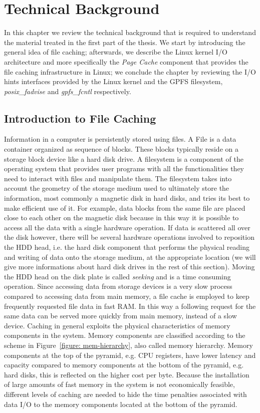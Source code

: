 \chapter{Technical Background} \label{chap: page-cache}
In this chapter we review the technical background that is required to understand the material treated in the first part of the thesis. We start by introducing the general idea
of file caching; afterwards, we describe the Linux kernel I/O architecture and more specifically the \textit{Page Cache} component that provides the file caching infrastructure in Linux; 
we conclude the chapter by reviewing the I/O hints interfaces provided by the Linux kernel and the GPFS filesystem, \textit{posix\_fadvise} and \textit{gpfs\_fcntl} respectively.

\section{Introduction to File Caching} \label{sec: gen-concept}
Information in a computer is persistently stored using files. A File is a data container organized as sequence of blocks. These blocks typically reside on a storage block device like a hard disk drive. 
A filesystem is a component of the operating system that provides user programs with all the functionalities they need to interact with files and manipulate them. The filesystem takes into account 
the geometry of the storage medium used to ultimately store the information, most commonly a magnetic disk in hard disks, and tries its best to make efficient use of it. For example, data blocks from 
the same file are placed close to each other on the magnetic disk because in this way it is possible to access all the data with a single hardware operation. If data is scattered all over the disk however, 
there will be several hardware operations involved to reposition the HDD head, i.e. the hard disk component that performs the physical reading and writing of data onto the storage medium, at the appropriate 
location (we will give more informations about hard disk drives in the rest of this section). Moving the HDD head on the disk plate is called \textit{seeking} and is a time consuming operation. Since accessing 
data from storage devices is a very slow process compared to accessing data from main memory, a file cache is employed to keep frequently requested file data in fast RAM. In this way a following request for 
the same data can be served more quickly from main memory, instead of a slow device. Caching in general exploits the physical characteristics of memory components in the system. Memory components are classified 
according to the scheme in Figure~\ref{figure: mem-hierarchy}, also called memory hierarchy. Memory components at the top of the pyramid, e.g. CPU registers, have lower latency and capacity compared to memory 
components at the bottom of the pyramid, e.g. hard disks, this is reflected on the higher cost per byte. Because the installation of large amounts of fast memory in the system is not economically feasible, 
different levels of caching are needed to hide the time penalties associated with data I/O to the memory components located at the bottom of the pyramid.

